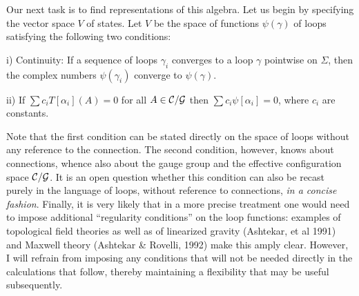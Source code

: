 Our next task is to find representations of this algebra. Let us begin by
specifying the vector space $V$ of states. Let $V$ be the space of functions
$\psi(\gamma)$ of loops satisfying the following two conditions:
\item{i)} {Continuity: If a sequence of loops $\gamma_i$ converges to a loop
$\gamma$ pointwise on $\Sigma$, then the complex numbers $\psi(\gamma_i)$
converge to $\psi(\gamma)$.}
\item{ii)} {If $\sum c_iT[\alpha_i](A) = 0$ for all $A\in {\cal C}/{\cal G}$
then $\sum c_i\psi[\alpha_i] =0$, where $c_i$ are constants.}

Note that the first condition can be stated directly on the space of loops
without any reference to the connection. The second condition, however,
knows about connections, whence also about the gauge group and the
effective configuration space ${\cal C}/{\cal G}$. It is an open question
whether this condition can also be recast purely in the language of loops,
without reference to connections, {\it in a concise fashion}. Finally,
it is very likely  that in a more precise treatment one would need to impose
additional ``regularity conditions'' on the loop functions: examples of
topological field theories as well as of linearized gravity (Ashtekar, et al
1991) and Maxwell theory (Ashtekar \& Rovelli, 1992)
make this amply clear. However, I will refrain from imposing any
conditions that will not be needed directly in the calculations that follow,
thereby maintaining a flexibility that may be useful subsequently.

